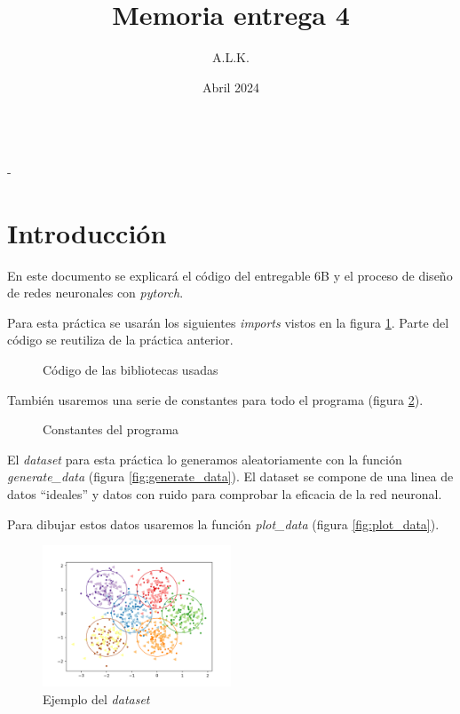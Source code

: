 \documentclass[6pt]{../../shared/AiTex}
\title{Memoria entrega 4}
\author{A.L.K.}
\date{Abril 2024}
\begin{document}
\justify

\begin{center}

    {\huge \textbf{\underline{\subtitulo}}} \\
    { \lesson - \autor}

\end{center}


\section*{Introducción}

En este documento se explicará el código del entregable 6B y el proceso de diseño de redes neuronales con \textit{pytorch}.

Para esta práctica se usarán los siguientes \textit{imports} vistos en la figura \ref{fig:imports}. Parte del código se reutiliza de la práctica anterior.
\begin{figure}[H]
    \centering
    
    \caption{Código de las bibliotecas usadas}
    \label{fig:imports}
\end{figure}

También usaremos una serie de constantes para todo el programa (figura \ref{fig:constants}).

\begin{figure}[H]
    \centering
    
    \caption{Constantes del programa}
    \label{fig:constants}
\end{figure}

El \textit{dataset} para esta práctica lo generamos aleatoriamente con la función \textit{generate\_data} (figura \ref{fig:generate_data}). El dataset se compone de una linea de datos ``ideales'' y datos con ruido para comprobar la eficacia de la red neuronal.

Para dibujar estos datos usaremos la función \textit{plot\_data} (figura \ref{fig:plot_data}).

\begin{figure}[H]
    \centering
    \includegraphics[width=0.5\textwidth]{./images/dataset.png}
    \caption{Ejemplo del \textit{dataset}}
    \label{fig:digitos}
\end{figure}
\end{document}
